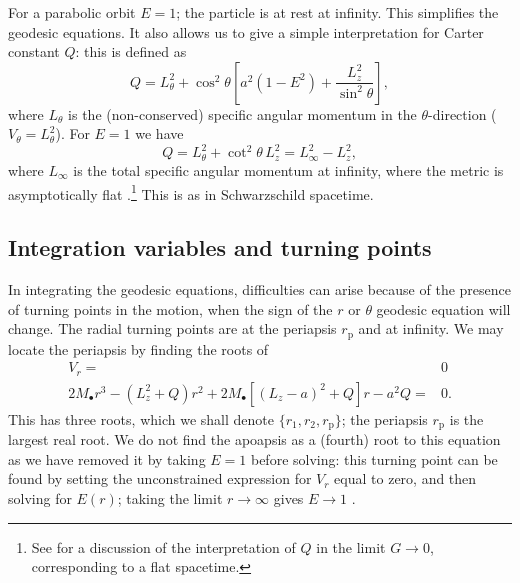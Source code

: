\documentclass[useAMS,usedcolumn,usegraphicx,usenatbib]{mn2e}
\newcommand{\sub}[1]{\ensuremath{_\mathrm{#1}}}
\begin{document}
For a parabolic orbit $E = 1$; the particle is at rest at infinity. This simplifies the geodesic equations. It also allows us to give a simple interpretation for Carter constant $Q$: this is defined as
\begin{equation}
Q = L_\theta^2 + \cos^2\theta\left[a^2\left(1 - E^2\right) + \frac{L_z^2}{\sin^2\theta}\right],
\end{equation}
where $L_\theta$ is the (non-conserved) specific angular momentum in the $\theta$-direction ($ V_\theta = L_\theta^2$). For $E = 1$ we have
\begin{equation}
Q = L_\theta^2 + \cot^2\theta\, L_z^2 = L_\infty^2 - L_z^2,
\end{equation}
where $L_\infty$ is the total specific angular momentum at infinity, where the metric is asymptotically flat \citep{DeFelice1980}.\footnote{See \citet{Rosquist2009} for a discussion of the interpretation of $Q$ in the limit $G \rightarrow 0$, corresponding to a flat spacetime.} This is as in Schwarzschild spacetime.

\subsection{Integration variables and turning points}

In integrating the geodesic equations, difficulties can arise because of the presence of turning points in the motion, when the sign of the $r$ or $\theta$ geodesic equation will change. The radial turning points are at the periapsis $r\sub{p}$ and at infinity. We may locate the periapsis by finding the roots of
\begin{align}
V_r = {} & 0 \nonumber \\
2M_\bullet r^3 - \left(L_z^2+Q\right)r^2 + 2M_\bullet\left[\left(L_z - a\right)^2 + Q\right]r - a^2Q = {} & 0.
\end{align}
This has three roots, which we shall denote $\{r_1, r_2, r\sub{p}\}$; the periapsis $r\sub{p}$ is the largest real root. We do not find the apoapsis as a (fourth) root to this equation as we have removed it by taking $E = 1$ before solving: this turning point can be found by setting the unconstrained expression for $V_r$ equal to zero, and then solving for $E(r)$; taking the limit $r \rightarrow \infty$ gives $E \rightarrow 1$ \citep{Wilkins1972}.
\end{document}
